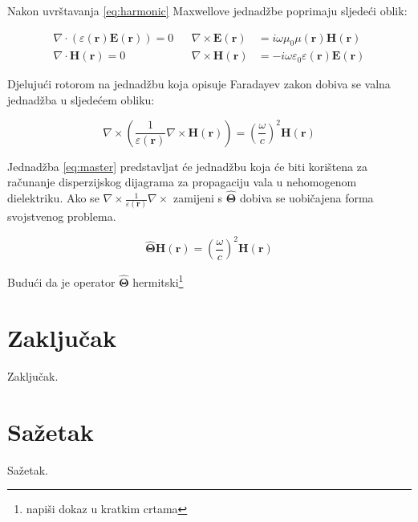 \documentclass[utf8, seminar]{fer}
\begin{document}
Nakon uvrštavanja \ref{eq:harmonic} Maxwellove jednadžbe poprimaju sljedeći
oblik:

\begin{align} \label{eq:maxwell3}
	\nabla \cdot (\varepsilon(\mathbf{r}) \mathbf{E}(\mathbf{r})) = 0 &&
	\nabla \times \mathbf{E}(\mathbf{r}) &=
		i \omega \mu_0 \mu(\mathbf{r})\mathbf{H}(\mathbf{r})  \nonumber \\
	\nabla \cdot \mathbf{H}(\mathbf{r}) = 0 &&
	\nabla \times \mathbf{H}(\mathbf{r}) &=
		- i \omega \varepsilon_0 \varepsilon(\mathbf{r})\mathbf{E}(\mathbf{r})
\end{align}

Djelujući rotorom na jednadžbu koja opisuje Faradayev zakon dobiva se valna
jednadžba u sljedećem obliku:

\begin{equation} \label{eq:master}
	\nabla \times \left(\frac{1}{\varepsilon(\mathbf{r})}\nabla
			\times \mathbf{H}(\mathbf{r}) \right)
			= \left( \frac{\omega}{c} \right)^2 \mathbf{H}(\mathbf{r})
\end{equation}

Jednadžba \ref{eq:master} predstavljat će jednadžbu koja će biti korištena za
računanje disperzijskog dijagrama za propagaciju vala u nehomogenom dielektriku.
Ako se ${\nabla \times \frac{1}{\varepsilon(\mathbf{r})} \nabla \times}$
zamijeni s $\hat{\mathbf{\Theta}}$ dobiva se uobičajena forma svojstvenog
problema.

\begin{equation}
	\hat{\mathbf{\Theta}} \mathbf{H}(\mathbf{r}) =
		\left( \frac{\omega}{c} \right)^2 \mathbf{H}(\mathbf{r})
\end{equation}

Budući da je operator $\hat{\mathbf{\Theta}}$ hermitski\footnote{napiši dokaz u
kratkim crtama}




\chapter{Zaključak}
Zaključak.




\chapter{Sažetak}
Sažetak.
\end{document}
